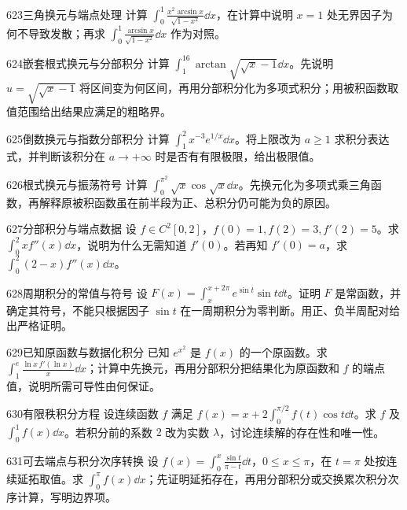 \begin{exercise}{623}{三角换元与端点处理}
计算 $\int_0^1\frac{x^2\arcsin x}{\sqrt{1-x^2}}\dd x$，在计算中说明 $x=1$ 处无界因子为何不导致发散；再求 $\int_0^1\frac{\arcsin x}{\sqrt{1-x^2}}\dd x$ 作为对照。
\end{exercise}
\begin{exercise}{624}{嵌套根式换元与分部积分}
计算 $\int_1^{16}\arctan\sqrt{\sqrt x-1}\dd x$。先说明 $u=\sqrt{\sqrt x-1}$ 将区间变为何区间，再用分部积分化为多项式积分；用被积函数取值范围给出结果应满足的粗略界。
\end{exercise}
\begin{exercise}{625}{倒数换元与指数分部积分}
计算 $\int_1^2x^{-3}e^{1/x}\dd x$。将上限改为 $a\ge1$ 求积分表达式，并判断该积分在 $a\to+\infty$ 时是否有有限极限，给出极限值。
\end{exercise}
\begin{exercise}{626}{根式换元与振荡符号}
计算 $\int_0^{\pi^2}\sqrt x\cos\sqrt x\dd x$。先换元化为多项式乘三角函数，再解释原被积函数虽在前半段为正、总积分仍可能为负的原因。
\end{exercise}
\begin{exercise}{627}{分部积分与端点数据}
设 $f\in C^2[0,2]$，$f(0)=1,f(2)=3,f'(2)=5$。求 $\int_0^2xf''(x)\dd x$，说明为什么无需知道 $f'(0)$。若再知 $f'(0)=a$，求 $\int_0^2(2-x)f''(x)\dd x$。
\end{exercise}
\begin{exercise}{628}{周期积分的常值与符号}
设 $F(x)=\int_x^{x+2\pi}e^{\sin t}\sin t\dd t$。证明 $F$ 是常函数，并确定其符号，不能只根据因子 $\sin t$ 在一周期积分为零判断。用正、负半周配对给出严格证明。
\end{exercise}
\begin{exercise}{629}{已知原函数与数据化积分}
已知 $e^{x^2}$ 是 $f(x)$ 的一个原函数。求 $\int_1^e\frac{\ln x\,f'(\ln x)}x\dd x$；计算中先换元，再用分部积分把结果化为原函数和 $f$ 的端点值，说明所需可导性由何保证。
\end{exercise}
\begin{exercise}{630}{有限秩积分方程}
设连续函数 $f$ 满足 $f(x)=x+2\int_0^{\pi/2}f(t)\cos t\dd t$。求 $f$ 及 $\int_0^1f(x)\dd x$。若积分前的系数 $2$ 改为实数 $\lambda$，讨论连续解的存在性和唯一性。
\end{exercise}
\begin{exercise}{631}{可去端点与积分次序转换}
设 $f(x)=\int_0^x\frac{\sin t}{\pi-t}\dd t$，$0\le x\le\pi$，在 $t=\pi$ 处按连续延拓取值。求 $\int_0^\pi f(x)\dd x$；先证明延拓存在，再用分部积分或交换累次积分次序计算，写明边界项。
\end{exercise}
